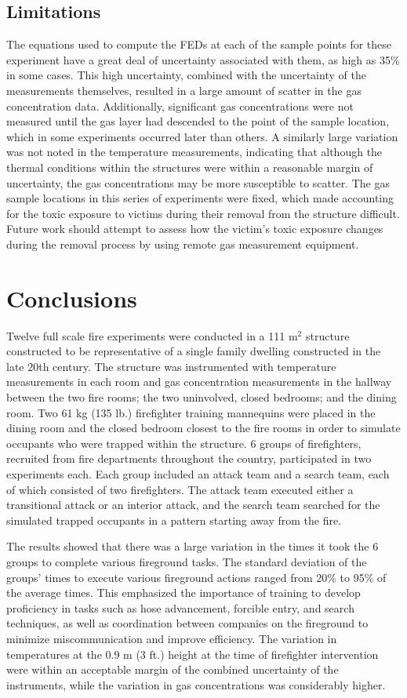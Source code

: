 \documentclass[12pt,oneside]{article}
\begin{document}
\subsection{Limitations}
 The equations used to compute the FEDs at each of the sample points for these experiment have a great deal of uncertainty associated with them, as high as 35\% in some cases. This high uncertainty, combined with the uncertainty of the measurements themselves, resulted in a large amount of scatter in the gas concentration data. Additionally, significant gas concentrations were not measured until the gas layer had descended to the point of the sample location, which in some experiments occurred later than others. A similarly large variation  was not noted in the temperature measurements, indicating that although the thermal conditions within the structures were within a reasonable margin of uncertainty, the gas concentrations may be more susceptible to scatter. The gas sample locations in this series of experiments were fixed, which made accounting for the toxic exposure to victims during their removal from the structure difficult. Future work should attempt to assess how the victim's toxic exposure changes during the removal process by using remote gas measurement equipment. 

\section{Conclusions}

Twelve full scale fire experiments were conducted in a 111 m$^2$ structure constructed to be representative of a single family dwelling constructed in the late 20th century. The structure was instrumented with temperature measurements in each room and gas concentration measurements in the hallway between the two fire rooms; the two uninvolved, closed bedrooms; and the dining room. Two 61 kg (135 lb.) firefighter training mannequins were placed in the dining room and the closed bedroom closest to the fire rooms in order to simulate occupants who were trapped within the structure. 6 groups of firefighters, recruited from fire departments throughout the country, participated in two experiments each. Each group included an attack team and a search team, each of which consisted of two firefighters. The attack team executed either a transitional attack or an interior attack, and the search team searched for the simulated trapped occupants in a pattern starting away from the fire. 

The results showed that there was a large variation in the times it took the 6 groups to complete various fireground tasks. The standard deviation of the groups' times to execute various fireground actions ranged from 20\% to 95\% of the average times. This emphasized the importance of training to develop proficiency in tasks such as hose advancement, forcible entry, and search techniques, as well as coordination between companies on the fireground to minimize miscommunication and improve efficiency. The variation in temperatures at the 0.9 m (3 ft.) height at the time of firefighter intervention were within an acceptable margin of the combined uncertainty of the instruments, while the variation in gas concentrations was considerably higher. 
\end{document}
